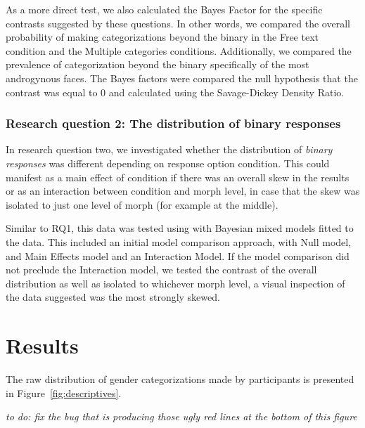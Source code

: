 \documentclass[
  man]{apa7}
\begin{document}
As a more direct test, we also calculated the Bayes Factor for the specific contrasts suggested by these questions. In other words, we compared the overall probability of making categorizations beyond the binary in the Free text condition and the Multiple categories conditions. Additionally,
we compared the prevalence of categorization beyond the binary specifically of the most androgynous faces. The Bayes factors were compared the null hypothesis that the contrast was equal to 0 and calculated using the Savage-Dickey Density Ratio.

\hypertarget{research-question-2-the-distribution-of-binary-responses}{%
\subsubsection{Research question 2: The distribution of binary responses}\label{research-question-2-the-distribution-of-binary-responses}}

In research question two, we investigated whether the distribution of \emph{binary responses} was different depending on response option condition. This could manifest as a main effect of condition if there was an overall skew in the results or as an interaction between condition and morph level, in case that the skew was isolated to just one level of morph (for example at the middle).

Similar to RQ1, this data was tested using with Bayesian mixed models fitted to the data. This included an initial model comparison approach, with Null model, and Main Effects model and an Interaction Model. If the model comparison did not preclude the Interaction model, we tested the contrast of the overall distribution as well as isolated to whichever morph level, a visual inspection of the data suggested was the most strongly skewed.

\hypertarget{results}{%
\section{Results}\label{results}}

The raw distribution of gender categorizations made by participants is presented in Figure~\ref{fig:descriptives}.

\emph{to do: fix the bug that is producing those ugly red lines at the bottom of this figure}
\end{document}
